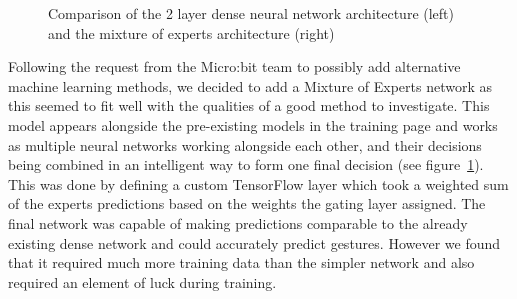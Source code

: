 \documentclass{article}
\begin{document}
\begin{figure}[h]
  \centering
  \caption{Comparison of the 2 layer dense neural network architecture (left) and the mixture of experts architecture (right)}
  \label{fig:moe}
\begin{minipage}{0.3\textwidth}
\end{minipage}
\begin{minipage}{0.3\textwidth}
\end{minipage}
\end{figure}

Following the request from the Micro:bit team to possibly add alternative machine learning methods, we decided to add a Mixture of Experts network as this seemed to fit well with the qualities of a good method to investigate. This model appears alongside the pre-existing models in the training page and works as multiple neural networks working alongside each other, and their decisions being combined in an intelligent way to form one final decision (see figure~\ref{fig:moe}). \\

This was done by defining a custom TensorFlow layer which took a weighted sum of the experts predictions based on the weights the gating layer assigned. The final network was capable of making predictions comparable to the already existing dense network and could accurately predict gestures. However we found that it required much more training data than the simpler network and also required an element of luck during training.
\end{document}
